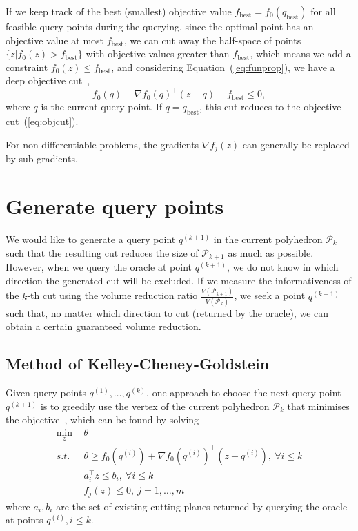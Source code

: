 \documentclass[9pt]{extarticle}
\begin{document}
If we keep track of the best (smallest) objective value $f_\text{best} = f_0(q_\text{best})$ for all feasible query points during the querying, 
since the optimal point has an objective value at most $f_\text{best}$, 
we can cut away the half-space of points $\{z | f_0(z) > f_\text{best} \}$ with objective values greater than $f_\text{best}$, 
which means we add a constraint $f_0(z) \le f_\text{best}$, and considering Equation~(\ref{eq:funprop}), 
we have a deep objective cut~\cite{boydlocalization},
\begin{equation}
\label{eq:deepobjcut}
f_0(q) + \nabla f_0(q)^\top (z - q) - f_\text{best} \le 0,
\end{equation}
where $q$ is the current query point. If $q = q_\text{best}$, this cut reduces to the objective cut~(\ref{eq:objcut}).

For non-differentiable problems, the gradients $\nabla f_j(z)$ can generally be replaced by sub-gradients.


\section{Generate query points}
\label{sec:query}

We would like to generate a query point $q^{(k+1)}$ in the current polyhedron $\mathcal{P}_{k}$ such that 
the resulting cut reduces the size of $\mathcal{P}_{k+1}$ as much as possible.
However, when we query the oracle at point $q^{(k+1)}$, we do not know in which direction the generated cut will be excluded.
If we measure the informativeness of the $k$-th cut using the volume reduction ratio $\frac{V(\mathcal{P}_{k+1})}{V(\mathcal{P}_{k})}$,
we seek a point $q^{(k+1)}$ such that, no matter which direction to cut (returned by the oracle), we can obtain a certain guaranteed volume reduction.


\subsection{Method of Kelley-Cheney-Goldstein}
\label{sec:kcg}

Given query points $q^{(1)}, \dots, q^{(k)}$, 
one approach to choose the next query point $q^{(k+1)}$ is to greedily use the vertex of the current polyhedron $\mathcal{P}_k$ 
that minimises the objective~\cite{wulff2013analytic}, which can be found by solving
\begin{equation}
\label{eq:kcg}
\begin{aligned}
\min_{z} ~& \theta  \\
s.t.~~   ~& \theta \ge f_0(q^{(i)}) + \nabla f_0(q^{(i)})^\top (z - q^{(i)}),~ \forall i \le k \\
          & a_i^\top z \le b_i,~ \forall i \le k \\
          & f_j(z) \le 0,~ j = 1, \dots, m
\end{aligned}
\end{equation}
where $a_i, b_i$ are the set of existing cutting planes returned by querying the oracle at points $q^{(i)}, i \le k$.
\end{document}
